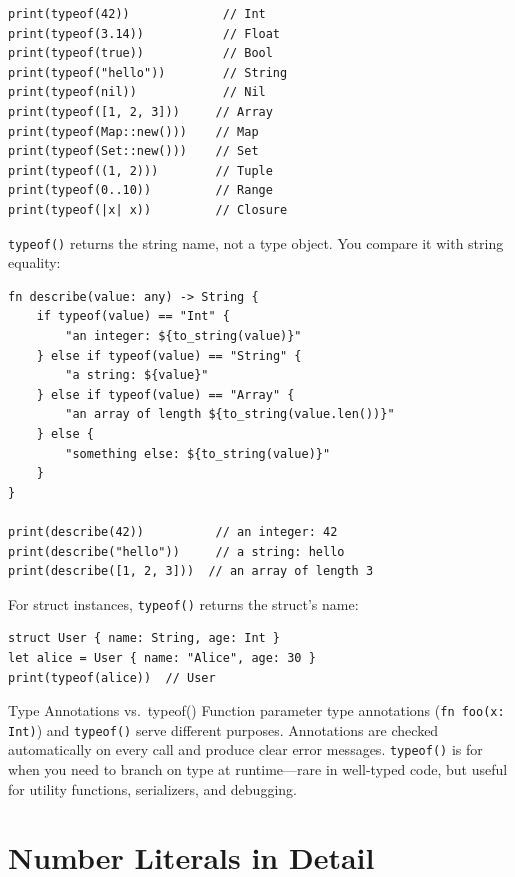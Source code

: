 \begin{lstlisting}[language=Lattice, caption={typeof() for every core type}]
print(typeof(42))             // Int
print(typeof(3.14))           // Float
print(typeof(true))           // Bool
print(typeof("hello"))        // String
print(typeof(nil))            // Nil
print(typeof([1, 2, 3]))     // Array
print(typeof(Map::new()))    // Map
print(typeof(Set::new()))    // Set
print(typeof((1, 2)))        // Tuple
print(typeof(0..10))         // Range
print(typeof(|x| x))         // Closure
\end{lstlisting}

\lstinline|typeof()| returns the string name, not a type object.
You compare it with string equality:

\begin{lstlisting}[language=Lattice, caption={Runtime type checking}]
fn describe(value: any) -> String {
    if typeof(value) == "Int" {
        "an integer: ${to_string(value)}"
    } else if typeof(value) == "String" {
        "a string: ${value}"
    } else if typeof(value) == "Array" {
        "an array of length ${to_string(value.len())}"
    } else {
        "something else: ${to_string(value)}"
    }
}

print(describe(42))          // an integer: 42
print(describe("hello"))     // a string: hello
print(describe([1, 2, 3]))  // an array of length 3
\end{lstlisting}

For struct instances, \lstinline|typeof()| returns the struct's name:

\begin{lstlisting}[language=Lattice, caption={typeof() with structs}]
struct User { name: String, age: Int }
let alice = User { name: "Alice", age: 30 }
print(typeof(alice))  // User
\end{lstlisting}

\begin{tipbox}{Type Annotations vs.\ typeof()}
Function parameter type annotations (\lstinline|fn foo(x: Int)|) and \lstinline|typeof()| serve different purposes.
Annotations are checked automatically on every call and produce clear error messages.
\lstinline|typeof()| is for when you need to branch on type at runtime---rare in well-typed code, but useful for utility functions, serializers, and debugging.
\end{tipbox}

\section{Number Literals in Detail}\label{sec:number-literals}

